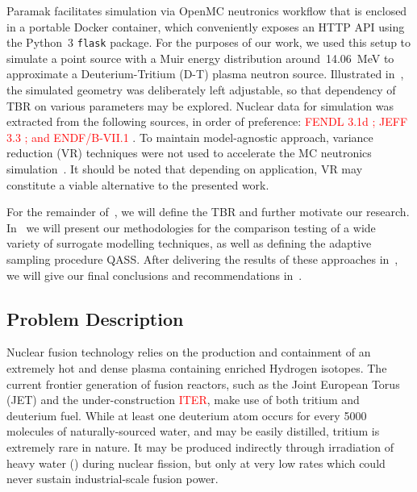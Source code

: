 Paramak facilitates simulation via OpenMC neutronics workflow that is enclosed in
a portable Docker container, which conveniently exposes an HTTP API using the
Python~3 \texttt{flask} package. For the purposes of our work, we used this setup to
simulate a point source with a Muir energy distribution \cite{openmcmuir}\footnotemark[1]
around~\SI{14.06}{\mega\electronvolt} to approximate a Deuterium-Tritium (D-T)
plasma neutron source. Illustrated in~, the simulated
geometry was deliberately left adjustable, so that dependency of TBR on various
parameters may be explored. Nuclear data for simulation was extracted from the following sources, in order of preference: \textcolor{red}{FENDL 3.1d \cite{fendl31d}; JEFF 3.3 \cite{jeff33}; and ENDF/B-VII.1 \cite{2011ii}}.
To maintain model-agnostic approach, variance reduction (VR) techniques
were not used to accelerate the MC neutronics simulation~\cite{Kleijnen2013}.
It should be noted that depending on application, VR may constitute a viable
alternative to the presented work.

For the remainder of~, we will define the TBR and further motivate our
research. In~ we will present our methodologies for the comparison
testing of a wide variety of surrogate modelling techniques, as well as defining the adaptive sampling procedure QASS. After delivering the
results of these approaches in~, we will give our final conclusions and
recommendations in~.



\subsection{Problem Description}
\label{sec:problemdescription}

Nuclear fusion technology relies on the production and containment of an
extremely hot and dense plasma containing enriched Hydrogen isotopes. The current frontier generation of fusion reactors, such as the Joint European Torus (JET) and the
under-construction \textcolor{red}{ITER}, make
use of both tritium and deuterium fuel. While at least one deuterium atom occurs for every \num{5000} molecules of naturally-sourced water, and may be easily distilled, tritium is extremely rare in nature. It may be produced indirectly through irradiation of heavy water
(\DDO) during nuclear fission, but only at very low rates which could
never sustain industrial-scale fusion power.

